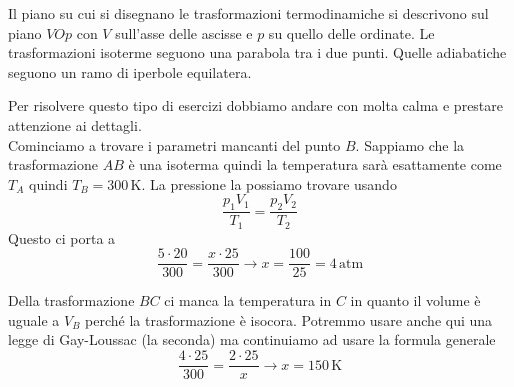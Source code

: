 Il piano su cui si disegnano le trasformazioni termodinamiche si descrivono sul piano $VOp$ con $V$
sull'asse delle ascisse e $p$ su quello delle ordinate. Le trasformazioni isoterme seguono una 
parabola tra i due punti. Quelle adiabatiche seguono un ramo di iperbole equilatera.
\begin{center}
\end{center}
Per risolvere questo tipo di esercizi dobbiamo andare con molta calma e prestare attenzione ai 
dettagli.\\
Cominciamo a trovare i parametri mancanti del punto $B$. Sappiamo che la trasformazione $AB$ è una
isoterma quindi la temperatura sarà esattamente come $T_A$ quindi $T_B = 300\,\text{K}$. La pressione
la possiamo trovare usando
\begin{equation*}
  \frac{p_1V_1}{T_1} = \frac{p_2V_2}{T_2}
\end{equation*}
Questo ci porta a
\begin{equation*}
  \frac{5\cdot20}{300}=\frac{x\cdot25}{300}\rightarrow x = \frac{100}{25}=\boxed{4\,\text{atm}}
\end{equation*}

Della trasformazione $BC$ ci manca la temperatura in $C$ in quanto il volume è uguale a $V_B$ perché
la trasformazione è isocora. Potremmo usare anche qui una legge di Gay-Loussac (la seconda) ma
continuiamo ad usare la formula generale
\begin{equation*}
  \frac{4\cdot25}{300}=\frac{2\cdot25}{x}\rightarrow x = \boxed{150\,\text{K}}
\end{equation*}

